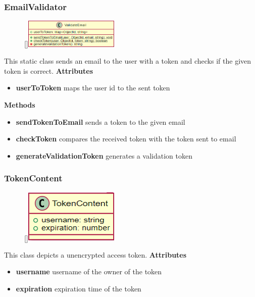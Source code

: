\subsubsection{EmailValidator}
\begin{figure}
    \raisebox{0pt}[\dimexpr{}\baselineskip\relax]{\includegraphics[width=4.5cm]{classes/auth/3.png}}
\end{figure} 
\par
This static class sends an email to the user with a token and checks if the given token is correct.
\newline
\newline
\textbf{Attributes}
\begin{itemize}
    \item \textbf{userToToken} maps the user id to the sent token
\end{itemize}
\textbf{Methods}
\begin{itemize}
    \item \textbf{sendTokenToEmail} sends a token to the given email 
    \item \textbf{checkToken} compares the received token with the token sent to email
    \item \textbf{generateValidationToken} generates a validation token
\end{itemize}

\subsubsection{TokenContent}
\begin{figure}
    \raisebox{0pt}[\dimexpr{}\baselineskip\relax]{\includegraphics[width=4.5cm]{classes/auth/4.png}}
\end{figure} 
\par
This class depicts a unencrypted access token.
\newline
\newline
\textbf{Attributes}
\begin{itemize}
    \item \textbf{username} username of the owner of the token
    \item \textbf{expiration} expiration time of the token
\end{itemize}

